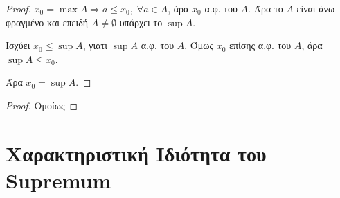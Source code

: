 \documentclass[main.tex]{subfiles}
\begin{document}

\begin{proof}
\item {}
  $ x_{0} = \max A \Rightarrow a \leq x_{0}, \; \forall a \in A $, άρα $ x_{0} $ α.φ. 
  του $A$. Άρα το $A$ είναι άνω φραγμένο και επειδή $ A \neq \emptyset $ υπάρχει 
  το $ \sup A $. 

  Ισχύει $ x_{0} \leq \sup A $, γιατι $ \sup A $ α.φ. του $A$.
  Όμως $ x_{0} $ επίσης α.φ. του $A$, άρα $ \sup A \leq x_{0} $.

  Άρα $ x_{0}= \sup A $.
\end{proof}


\begin{proof}
  Ομοίως 
\end{proof}

\section{Χαρακτηριστική Ιδιότητα του Supremum}

\end{document}
